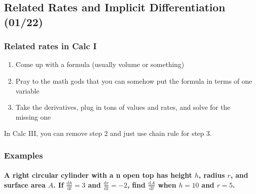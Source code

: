 \documentclass[
  letterpaper,
  DIV=11,
  numbers=noendperiod]{scrartcl}
\let\oldparagraph\paragraph
\renewcommand{\paragraph}[1]{\oldparagraph{#1}\mbox{}}
\providecommand{\tightlist}{%
  \setlength{\itemsep}{0pt}\setlength{\parskip}{0pt}}\usepackage{longtable,booktabs,array}
\begin{document}
\hypertarget{related-rates-and-implicit-differentiation-0122}{%
\subsection{Related Rates and Implicit Differentiation
(01/22)}\label{related-rates-and-implicit-differentiation-0122}}

\hypertarget{related-rates-in-calc-i}{%
\subsubsection{Related rates in Calc I}\label{related-rates-in-calc-i}}

\begin{enumerate}
\def\labelenumi{\arabic{enumi})}
\tightlist
\item
  Come up with a formula (usually volume or something)
\item
  Pray to the math gods that you can somehow put the formula in terms of
  one variable
\item
  Take the derivatives, plug in tons of values and rates, and solve for
  the missing one
\end{enumerate}

In Calc III, you can remove step 2 and just use chain rule for step 3.

\hypertarget{examples-9}{%
\subsubsection{Examples}\label{examples-9}}

\hypertarget{a-right-circular-cylinder-with-a-n-open-top-has-height-h-radius-r-and-surface-area-a.-if-fracmathrmdhmathrmdt-3-and-fracmathrmdrmathrmdt--2-find-fracmathrmdamathrmdt-when-h10-and-r5.}{%
\paragraph{\texorpdfstring{A right circular cylinder with a n open top
has height \(h\), radius \(r\), and surface area \(A\). If
\(\frac{\mathrm{d}h}{\mathrm{d}t} = 3\) and
\(\frac{\mathrm{d}r}{\mathrm{d}t} = -2\), find
\(\frac{\mathrm{d}A}{\mathrm{d}t}\) when \(h=10\) and
\(r=5\).}{A right circular cylinder with a n open top has height h, radius r, and surface area A. If \textbackslash frac\{\textbackslash mathrm\{d\}h\}\{\textbackslash mathrm\{d\}t\} = 3 and \textbackslash frac\{\textbackslash mathrm\{d\}r\}\{\textbackslash mathrm\{d\}t\} = -2, find \textbackslash frac\{\textbackslash mathrm\{d\}A\}\{\textbackslash mathrm\{d\}t\} when h=10 and r=5.}}\label{a-right-circular-cylinder-with-a-n-open-top-has-height-h-radius-r-and-surface-area-a.-if-fracmathrmdhmathrmdt-3-and-fracmathrmdrmathrmdt--2-find-fracmathrmdamathrmdt-when-h10-and-r5.}}
\end{document}
